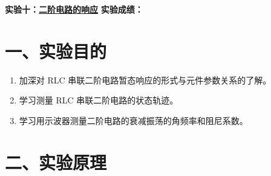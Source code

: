 \documentclass[12pt,a4paper]{article}
\begin{document}
\noindent
{\Large \textbf{实验十：}\underline{\textbf{二阶电路的响应}}} \hfill {\Large \textbf{实验成绩：}\underline{\hspace{3cm}}}
\vspace{0.5cm}

\section*{一、实验目的}
\begin{enumerate}
    \item 加深对 RLC 串联二阶电路暂态响应的形式与元件参数关系的了解。
    \item 学习测量 RLC 串联二阶电路的状态轨迹。
    \item 学习用示波器测量二阶电路的衰减振荡的角频率和阻尼系数。
\end{enumerate}

\section*{二、实验原理}
\end{document}
